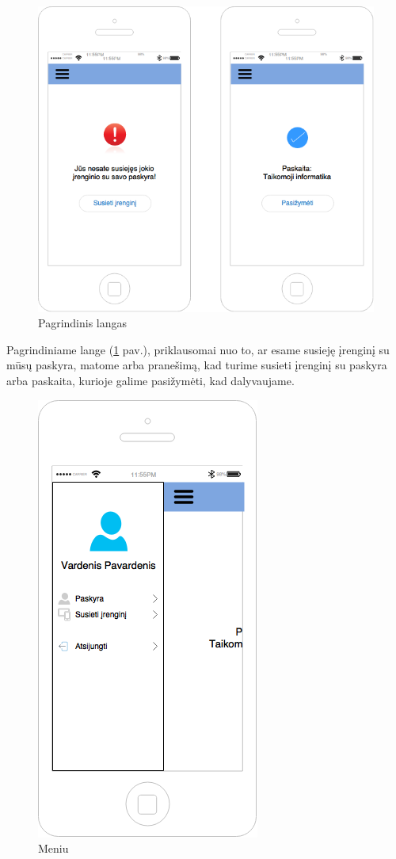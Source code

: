 \documentclass{VUMIFPSkursinis}
\begin{document}
\begin{figure}[H]
	\centering
	\includegraphics[scale=0.5]{img/kursinio_app_main}
	\caption{Pagrindinis langas}
	\label{img:mainView}
\end{figure}

Pagrindiniame lange (\ref{img:mainView} pav.), priklausomai nuo to, ar esame susieję įrenginį su mūsų paskyra, matome arba pranešimą, kad turime susieti įrenginį su paskyra arba paskaita, kurioje galime pasižymėti, kad dalyvaujame.

\begin{figure}[H]
	\centering
	\includegraphics[scale=0.5]{img/kursinio_app_menu}
	\caption{Meniu}
	\label{img:menuView}
\end{figure}
\end{document}
